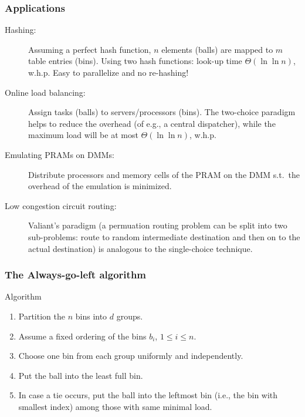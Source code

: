 \documentclass[serif,professionalfonts]{beamer}
\newcommand\scalefac{0.55}
\newcommand\ballsize{5mm}
\newcommand\nrbins{6}
\newcommand\padding{0.1*\ballsize}
\newcommand\binheight{5*\balldiameter}
\newcommand\bingap{1.6*\balldiameter}
\newcommand\balldiameter{2*\ballsize}
\newcommand\iA[2][0]{
	\path (\nbid) edge[insert, bend left=#1] (#2);
}
\newcommand\bin[1]{
	\path node[topflat, xshift=#1*\bingap*\scalefac, above, yshift=-\padding*\scalefac]  {};
}
\newcommand\bins{
	\foreach \ibin in {1,...,\nrbins}
		\bin{\ibin};
}
\newcommand\setNode[2]{
	\draw let \n1 ={#1#2} in node[circle, minimum size = \ballsize](n\n1) at (#1*\bingap,#2*\balldiameter-\ballsize) {};
}
\newcommand\nodes{
	\foreach \i in {1,...,6}
		\foreach \j in {1,...,5}
			\setNode{\i}{\j};
}
\newcommand\ball[2]{
	\shade[ballstyle] (#1*\bingap,#2*\balldiameter-\ballsize) circle (\ballsize) {};
}
\newcommand\nbid{nb}
\newcommand\newball{
	\draw node[circle, minimum size = \ballsize](\nbid) at (0*\bingap,6*\balldiameter-\ballsize) {};
	\ball{0}{6};
}
\newcommand\putinbin[2]{
	\ifnum #2 > 0
		\foreach \nrballs in {1,...,#2}
 			\ball{#1}{\nrballs};
 	\fi
}
\newcounter{index}
\newcommand\balls[1]{%
	\getargsC{#1}%
  	\setcounter{index}{0}%
  	\whiledo{\theindex < \narg}{%
    		\stepcounter{index}%
    		\putinbin{\theindex}{\csname arg\romannumeral\theindex\endcsname}%
  	}%
}
\newcommand\bab[1]{%
	\bins
	\nodes
	\balls{#1}
}
\newcommand\groupSep[1]{
	\draw[thick, color=red!40] let \n1={(#1+0.5)*\bingap} in (\n1,-\ballsize) -- (\n1,\binheight +\ballsize);
}
\begin{document}
\begin{frame}
\frametitle{Applications}
\begin{description}
	\item[Hashing:] Assuming a perfect hash function, $n$ elements (balls) are mapped to $m$ table entries (bins). Using two hash functions: look-up time $\Theta(\ln\ln n)$, w.h.p. \alert{Easy to parallelize} and no \alert{re-hashing}!
	\item[Online load balancing:] Assign tasks (balls) to servers/processors (bins). The two-choice paradigm helps to \alert{reduce the overhead} (of e.g., a central dispatcher), while the maximum load will be at most  $\Theta(\ln\ln n)$, w.h.p.
	\item[Emulating PRAMs on DMMs:] Distribute processors and memory cells of the PRAM on the DMM s.t.~the overhead of the emulation is minimized.
	\item[Low congestion circuit routing:] \alert{Valiant's paradigm} (a permuation routing problem can be split into two sub-problems: route to random intermediate destination and then on to the actual destination) is analogous to the single-choice technique.
\end{description}
\end{frame}


\newcommand\aglAlgorithm{
\begin{exampleblock}{Algorithm}
\begin{enumerate}
\item Partition the $n$ bins into $d$ groups.
\item Assume a fixed ordering of the bins $b_i$, $1\leq i \leq n$.
\item Choose one bin from each group uniformly and independently.
\item Put the ball into the least full bin.
\item In case a tie occurs, put the ball into the leftmost bin (i.e., the bin with smallest index) among those with same minimal load.
\end{enumerate}
\end{exampleblock}
}

\begin{frame}[shrink]
\frametitle{The Always-go-left algorithm}
\aglAlgorithm

\begin{center}
\end{center}

\end{frame}
\end{document}
